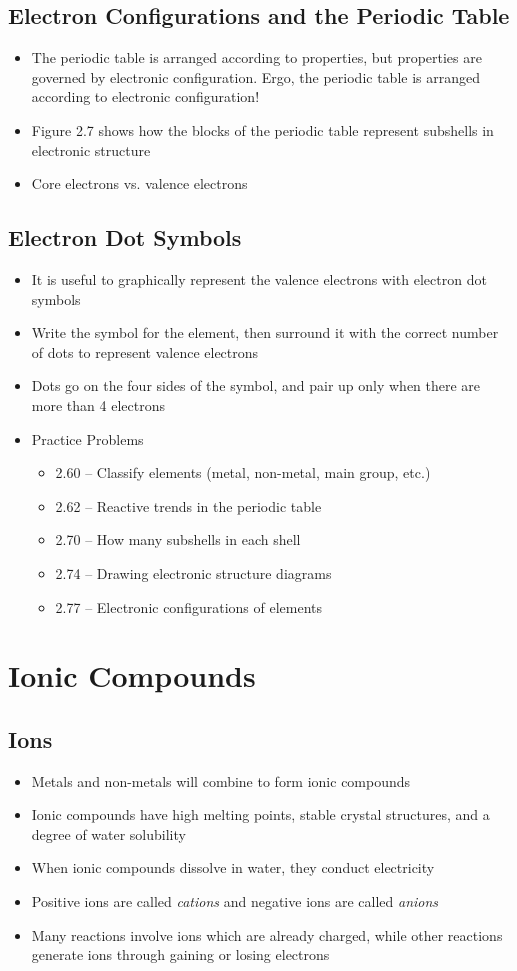 \documentclass[12pt, openany, letterpaper]{memoir}
\begin{document}
\section{Electron Configurations and the Periodic Table}
\begin{itemize}
	\item The periodic table is arranged according to properties, but properties are governed by electronic configuration. Ergo, the periodic table is arranged according to electronic configuration!
	\item Figure 2.7 shows how the blocks of the periodic table represent subshells in electronic structure
	\item Core electrons vs. valence electrons
\end{itemize}
\section{Electron Dot Symbols}
\begin{itemize}
	\item It is useful to graphically represent the valence electrons with electron dot symbols
	\item Write the symbol for the element, then surround it with the correct number of dots to represent valence electrons
	\item Dots go on the four sides of the symbol, and pair up only when there are more than 4 electrons
	\item Practice Problems
	\begin{itemize}
		\item 2.60 -- Classify elements (metal, non-metal, main group, etc.)
		\item 2.62 -- Reactive trends in the periodic table
		\item 2.70 -- How many subshells in each shell
		\item 2.74 -- Drawing electronic structure diagrams
		\item 2.77 -- Electronic configurations of elements
	\end{itemize}
\end{itemize}

\chapter{Ionic Compounds}
\section{Ions}
\begin{itemize}
	\item Metals and non-metals will combine to form ionic compounds
	\item Ionic compounds have high melting points, stable crystal structures, and a degree of water solubility
	\item When ionic compounds dissolve in water, they conduct electricity
	\item Positive ions are called \emph{cations} and negative ions are called \emph{anions}
	\item Many reactions involve ions which are already charged, while other reactions generate ions through gaining or losing electrons
\end{itemize}
\end{document}
